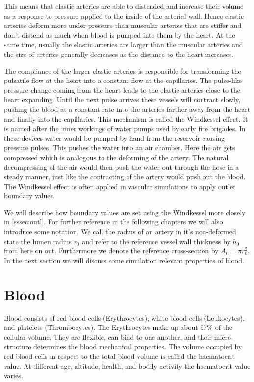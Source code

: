 \documentclass[a4paper, oneside]{discothesis}
\begin{document}
This means that elastic arteries are able to distended and increase their volume as a response to pressure applied to the inside of the arterial wall.
Hence elastic arteries deform more under pressure than muscular arteries that are stiffer and don't distend as much when blood is pumped into them by the heart.
At the same time, usually the elastic arteries are larger than the muscular arteries and the size of arteries generally decreases as the distance to the heart increases.

The compliance of the larger elastic arteries is responsible for transforming the pulsatile flow at the heart into a constant flow at the capillaries.
The pulse-like pressure change coming from the heart leads to the elastic arteries close to the heart expanding.
Until the next pulse arrives these vessels will contract slowly, pushing the blood at a constant rate into the arteries farther away from the heart and finally into the capillaries.
This mechanism is called the Windkessel effect.
It is named after the inner workings of water pumps used by early fire brigades.
In these devices water would be pumped by hand from the reservoir causing pressure pulses.
This pushes the water into an air chamber.
Here the air gets compressed which is analogous to the deforming of the artery.
The natural decompressing of the air would then push the water out through the hose in a steady manner, just like the contracting of the artery would push out the blood.
The Windkessel effect is often applied in vascular simulations to apply outlet boundary values. \cite{köppl2023dimension}

We will describe how boundary values are set using the Windkessel more closely in \autoref{sssec:outl}.
For further reference in the following chapters we will also introduce some notation.
We call the radius of an artery in it's non-deformed state the lumen radius $r_0$ and refer to the reference vessel wall thickness by $h_0$ from here on out.
Furthermore we denote the reference cross-section by $A_0 = \pi r_0^2$.
In the next section we will discuss some simulation relevant properties of blood.

\section{Blood} \label{sec:b}
Blood consists of red blood cells (Erythrocytes), white blood cells (Leukocytes), and platelets (Thrombocytes).
The Erythrocytes make up about 97\% of the cellular volume.
They are flexible, can bind to one another, and their micro-structure determines the blood mechanical properties.
The volume occupied by red blood cells in respect to the total blood volume is called the haematocrit value.
At different age, altitude, health, and bodily activity the haematocrit value varies.
\end{document}
